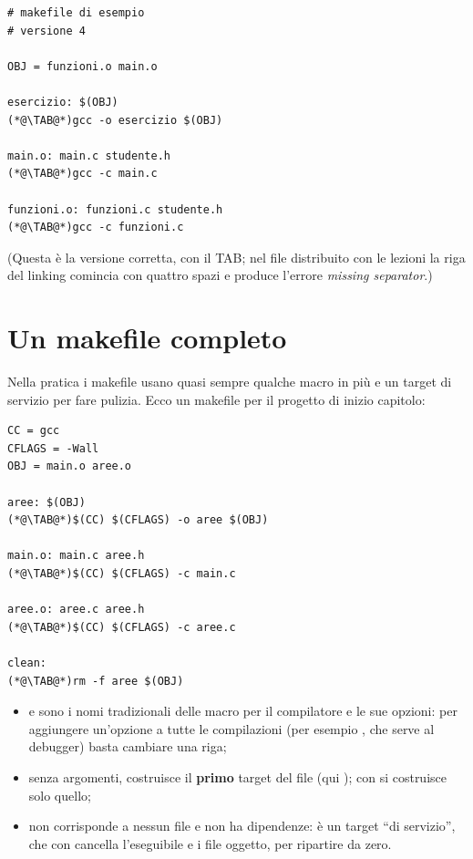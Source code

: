 \begin{lstlisting}[style=make, name=makefile4]
# makefile di esempio
# versione 4

OBJ = funzioni.o main.o

esercizio: $(OBJ)
(*@\TAB@*)gcc -o esercizio $(OBJ)

main.o: main.c studente.h
(*@\TAB@*)gcc -c main.c

funzioni.o: funzioni.c studente.h
(*@\TAB@*)gcc -c funzioni.c
\end{lstlisting}

(Questa è la versione corretta, con il TAB; nel file distribuito con le
lezioni la riga del linking comincia con quattro spazi e produce l'errore
\textit{missing separator}.)

\section{Un makefile completo}

Nella pratica i makefile usano quasi sempre qualche macro in più e un
target di servizio per fare pulizia. Ecco un makefile per il progetto
 di inizio capitolo:

\begin{affianco}[0.5]
\begin{lstlisting}[style=make, name=Makefile]
CC = gcc
CFLAGS = -Wall
OBJ = main.o aree.o

aree: $(OBJ)
(*@\TAB@*)$(CC) $(CFLAGS) -o aree $(OBJ)

main.o: main.c aree.h
(*@\TAB@*)$(CC) $(CFLAGS) -c main.c

aree.o: aree.c aree.h
(*@\TAB@*)$(CC) $(CFLAGS) -c aree.c

clean:
(*@\TAB@*)rm -f aree $(OBJ)
\end{lstlisting}
\risultato
{}
\end{affianco}

\begin{itemize}
  \item {} e  sono i nomi tradizionali delle macro per
        il compilatore e le sue opzioni: per aggiungere un'opzione a tutte
        le compilazioni (per esempio , che serve al debugger) basta
        cambiare una riga;
  \item senza argomenti,  costruisce il \textbf{primo} target del
        file (qui ); con  si costruisce solo
        quello;
  \item {} non corrisponde a nessun file e non ha dipendenze: è un
        target “di servizio”, che con  cancella
        l'eseguibile e i file oggetto, per ripartire da zero.
\end{itemize}

